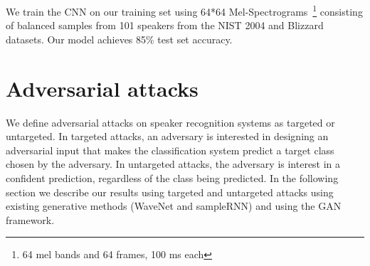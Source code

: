 We train the CNN on our training set using 64*64 Mel-Spectrograms~\footnote{64 mel bands and 64 frames, 100 ms each} consisting of balanced samples from 101 speakers from the NIST 2004 and Blizzard datasets. Our model achieves 85\% test set accuracy.

\section{Adversarial attacks}
We define adversarial attacks on speaker recognition systems as targeted or untargeted. In
targeted attacks, an adversary is interested in designing an adversarial input
that makes the classification system predict a target class chosen by the
adversary. In untargeted attacks, the adversary is interest in a confident
prediction, regardless of the class being predicted. In the following section we
describe our results using targeted and untargeted attacks using existing
generative methods (WaveNet and sampleRNN) and using the GAN framework.
